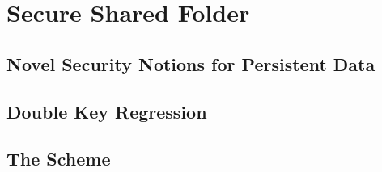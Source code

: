 \section{Secure Shared Folder}\label{sc:SSF}

\subsection{Novel Security Notions for Persistent Data}

\subsection{Double Key Regression}\label{ssc:DKR}

\subsection{The Scheme}



